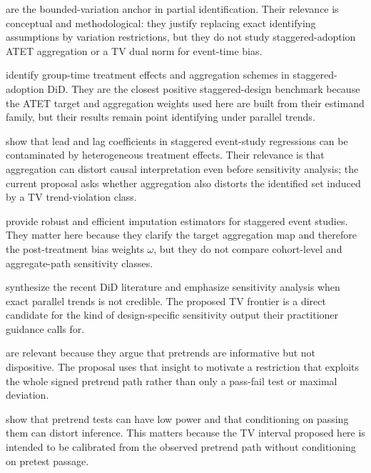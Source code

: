 \documentclass[11pt]{article}
\theoremstyle{definition}
\theoremstyle{plain}
\theoremstyle{remark}
\begin{document}
\citet{ManskiPepper2018BoundedVariation} are the bounded-variation anchor in partial identification. Their relevance is conceptual and methodological: they justify replacing exact identifying assumptions by variation restrictions, but they do not study staggered-adoption ATET aggregation or a TV dual norm for event-time bias.

\citet{CallawaySantAnna2021MultiplePeriods} identify group-time treatment effects and aggregation schemes in staggered-adoption DiD. They are the closest positive staggered-design benchmark because the ATET target and aggregation weights used here are built from their estimand family, but their results remain point identifying under parallel trends.

\citet{SunAbraham2021DynamicEffects} show that lead and lag coefficients in staggered event-study regressions can be contaminated by heterogeneous treatment effects. Their relevance is that aggregation can distort causal interpretation even before sensitivity analysis; the current proposal asks whether aggregation also distorts the identified set induced by a TV trend-violation class.

\citet{BorusyakJaravelSpiess2024EventStudies} provide robust and efficient imputation estimators for staggered event studies. They matter here because they clarify the target aggregation map and therefore the post-treatment bias weights \(\omega\), but they do not compare cohort-level and aggregate-path sensitivity classes.

\citet{RothSantAnnaBilinskiPoe2023TrendingDiD} synthesize the recent DiD literature and emphasize sensitivity analysis when exact parallel trends is not credible. The proposed TV frontier is a direct candidate for the kind of design-specific sensitivity output their practitioner guidance calls for.

\citet{KahnLangLang2020PromisePitfalls} are relevant because they argue that pretrends are informative but not dispositive. The proposal uses that insight to motivate a restriction that exploits the whole signed pretrend path rather than only a pass-fail test or maximal deviation.

\citet{Roth2022PretestCaution} show that pretrend tests can have low power and that conditioning on passing them can distort inference. This matters because the TV interval proposed here is intended to be calibrated from the observed pretrend path without conditioning on pretest passage.
\end{document}
